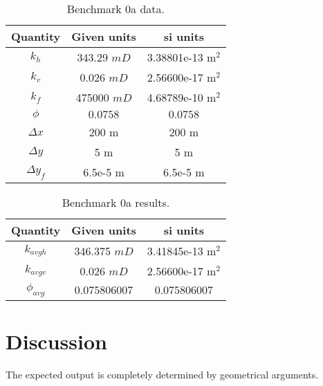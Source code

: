 \documentclass{article}
\begin{document}
\begin{table}[H]
\begin{centering}
\begin{tabular}{|c|c|c|}
\hline 
Quantity & Given units & si units\tabularnewline
\hline 
\hline 
$k_{h}$ & 343.29 $mD$ & 3.38801e-13 $\si{\square\metre}$ \tabularnewline
\hline 
$k_{v}$ & 0.026 $mD$ & 2.56600e-17 $\si{\square\metre}$ \tabularnewline
\hline 
$k_{f}$ & 475000 $mD$ & 4.68789e-10 $\si{\square\metre}$ \tabularnewline
\hline 
$\phi$ & $0.0758$ & $0.0758$\tabularnewline
\hline 
$\Delta x$ & 200 $\si{\metre}$  & 200 $\si{\metre}$ \tabularnewline
\hline 
$\Delta y$ & 5 $\si{\metre}$  & 5 $\si{\metre}$ \tabularnewline
\hline 
$\Delta y_{f}$ & 6.5e-5 $\si{\metre}$  & 6.5e-5 $\si{\metre}$ \tabularnewline
\hline 
\end{tabular}
\par\end{centering}
\caption{Benchmark 0a data.}

\end{table}
\begin{table}[H]
\begin{centering}
\begin{tabular}{|c|c|c|}
\hline 
Quantity & Given units & si units\tabularnewline
\hline 
\hline 
$k_{avgh}$ & 346.375 $mD$ & 3.41845e-13 $\si{\square\metre}$ \tabularnewline
\hline 
$k_{avgv}$ & 0.026 $mD$ & 2.56600e-17 $\si{\square\metre}$ \tabularnewline
\hline 
$\phi_{avg}$ & $0.075806007$ & $0.075806007$\tabularnewline
\hline 
\end{tabular}
\par\end{centering}
\caption{Benchmark 0a results.}
\end{table}

\section{Discussion}

The expected output is completely determined by geometrical arguments.
\end{document}
